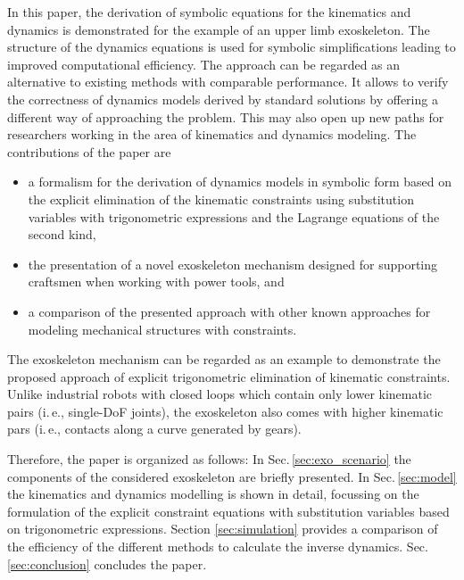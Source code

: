 \documentclass{svproc}
\begin{document}
In this paper, the derivation of symbolic equations for the kinematics and dynamics is demonstrated for the example of an upper limb exoskeleton.
The structure of the dynamics equations is used for symbolic simplifications leading to improved computational efficiency.
The approach can be regarded as an alternative to existing methods with comparable performance.
It allows to verify the correctness of dynamics models derived by standard solutions by offering a different way of approaching the problem.
This may also open up new paths for researchers working in the area of kinematics and dynamics modeling.
The contributions of the paper are

\vspace{-0.20cm}

\begin{itemize}
    \item a formalism for the derivation of dynamics models in symbolic form based on the explicit elimination of the kinematic constraints using substitution variables with trigonometric expressions and the Lagrange equations of the second kind,
    \item the presentation of a novel exoskeleton mechanism designed for supporting craftsmen when working with power tools, and
    \item a comparison of the presented approach with other known approaches for modeling mechanical structures with constraints.
\end{itemize}
\vspace{-0.25cm}
The exoskeleton mechanism can be regarded as an example to demonstrate the proposed approach of explicit trigonometric elimination of kinematic constraints.
Unlike industrial robots with closed loops which contain only lower kinematic pairs (i.\,e., single-DoF joints), the exoskeleton also comes with higher kinematic pars (i.\,e., contacts along a curve generated by gears).

Therefore, the paper is organized as follows:
In Sec.\,\ref{sec:exo_scenario} the components of the considered exoskeleton are briefly presented.
In Sec.\,\ref{sec:model} the kinematics and dynamics modelling is shown in detail, focussing on the formulation of the explicit constraint equations with substitution variables based on trigonometric expressions.
Section \ref{sec:simulation} provides a comparison of the efficiency of the different methods to calculate the inverse dynamics.
Sec.\,\ref{sec:conclusion} concludes the paper.
\end{document}
